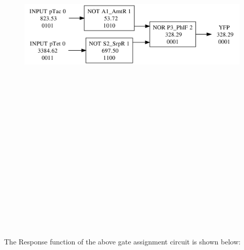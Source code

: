 \documentclass[11pt]{article}
\begin{document}
\begin{figure}[ht!]
\centering
\includegraphics[width=16cm,height=16cm,keepaspectratio]{ex_synthesis.png}
\label{Logic synthesis for AND gate}
\end{figure}
\\[\baselineskip]   
\\[\baselineskip]   
\\[\baselineskip]   
\\[\baselineskip]   
The Response function of the above gate assignment circuit is shown below:
\\[\baselineskip]   
\end{document}
